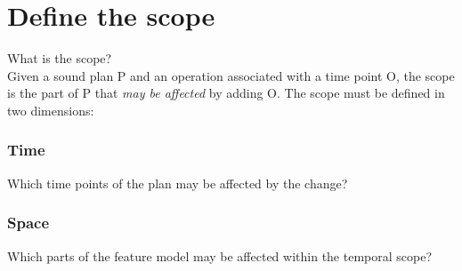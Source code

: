 
\section{Define the scope}
\label{sec:define-the-scope}
What is the scope?
\\

Given a sound plan P and an operation associated with a time point O, the scope is the part of P that \textit{may be affected} by adding O. The scope must be defined in two dimensions:\\

\subsubsection*{Time}
Which time points of the plan may be affected by the change?

\subsubsection*{Space}
Which parts of the feature model may be affected within the temporal scope?

